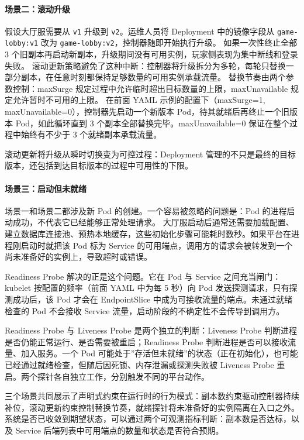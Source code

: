 \paragraph{场景二：滚动升级}
假设大厅服需要从 \texttt{v1} 升级到 \texttt{v2}。运维人员将 Deployment 中的镜像字段从 \texttt{game-lobby:v1} 改为 \texttt{game-lobby:v2}，控制器随即开始执行升级。
如果一次性终止全部 3 个旧副本再启动新副本，升级期间没有可用实例，玩家侧表现为集中断线和登录失败。
滚动更新策略避免了这种中断：控制器将升级拆分为多轮，每轮只替换一部分副本，在任意时刻都保持足够数量的可用实例承载流量。
替换节奏由两个参数控制：maxSurge 规定过程中允许临时超出目标数量的上限，maxUnavailable 规定允许暂时不可用的上限。
在前面 YAML 示例的配置下（maxSurge=1, maxUnavailable=0），控制器先启动一个新版本 Pod，待其就绪后再终止一个旧版本 Pod，如此循环直到 3 个副本全部替换完毕。maxUnavailable=0 保证在整个过程中始终有不少于 3 个就绪副本承载流量。

滚动更新将升级从瞬时切换变为可控过程：Deployment 管理的不只是最终的目标版本，还包括到达目标版本的过程中可用性的下限。

\paragraph{场景三：启动但未就绪}
场景一和场景二都涉及新 Pod 的创建。一个容易被忽略的问题是：Pod 的进程启动成功，不代表它已经能够正常处理请求。
大厅服启动后通常还需要加载配置、建立数据库连接池、预热本地缓存，这些初始化步骤可能耗时数秒。如果平台在进程刚启动时就把该 Pod 标为 Service 的可用端点，调用方的请求会被转发到一个尚未准备好的实例上，导致超时或错误。

Readiness Probe 解决的正是这个问题。它在 Pod 与 Service 之间充当闸门：kubelet 按配置的频率（前面 YAML 中为每 5 秒）向 Pod 发送探测请求，只有探测成功后，该 Pod 才会在 EndpointSlice 中成为可接收流量的端点。未通过就绪检查的 Pod 不会接收 Service 流量，启动阶段的不确定性不会传导到调用方。

Readiness Probe 与 Liveness Probe 是两个独立的判断：Liveness Probe 判断进程是否仍能正常运行、是否需要被重启；Readiness Probe 判断进程是否可以接收流量、加入服务。一个 Pod 可能处于”存活但未就绪”的状态（正在初始化），也可能已经通过就绪检查，但随后因死锁、内存泄漏或探测失败被 Liveness Probe 重启。两个探针各自独立工作，分别触发不同的平台动作。

三个场景共同展示了声明式约束在运行时的行为模式：副本数约束驱动控制器持续补位，滚动更新约束控制替换节奏，就绪探针将未准备好的实例隔离在入口之外。
系统是否已收敛到期望状态，可以通过两个可观测指标判断：副本数是否达标，以及 Service 后端列表中可用端点的数量和状态是否符合预期。

